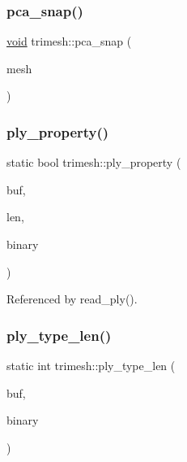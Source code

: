 \mbox{\label{namespacetrimesh_a6b6c8d067ad921e0219c16f7872b267a}} 
\subsubsection{\texorpdfstring{pca\+\_\+snap()}{pca\_snap()}}
{\footnotesize\ttfamily \hyperlink{namespacetrimesh_a784ddfd979e1c579bda795a8edfc3f43}{void} trimesh\+::pca\+\_\+snap (\begin{DoxyParamCaption}\item[{\hyperlink{classtrimesh_1_1TriMesh}{Tri\+Mesh} $\ast$}]{mesh }\end{DoxyParamCaption})}

\mbox{\label{namespacetrimesh_a2675cdbe870a83e10aef9e085dad6ec2}} 
\subsubsection{\texorpdfstring{ply\+\_\+property()}{ply\_property()}}
{\footnotesize\ttfamily static bool trimesh\+::ply\+\_\+property (\begin{DoxyParamCaption}\item[{const char $\ast$}]{buf,  }\item[{int \&}]{len,  }\item[{bool}]{binary }\end{DoxyParamCaption})\hspace{0.3cm}{\ttfamily [static]}}



Referenced by read\+\_\+ply().

\mbox{\label{namespacetrimesh_a1203bd856b8dae134b67074f6c1cfa4b}} 
\subsubsection{\texorpdfstring{ply\+\_\+type\+\_\+len()}{ply\_type\_len()}}
{\footnotesize\ttfamily static int trimesh\+::ply\+\_\+type\+\_\+len (\begin{DoxyParamCaption}\item[{const char $\ast$}]{buf,  }\item[{bool}]{binary }\end{DoxyParamCaption})\hspace{0.3cm}{\ttfamily [static]}}



